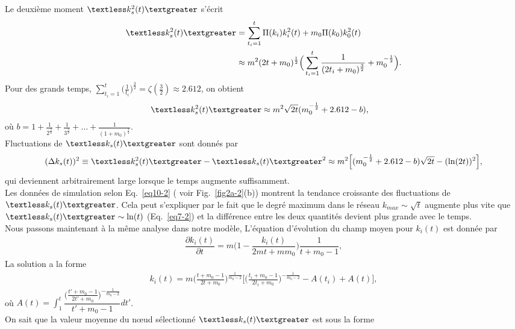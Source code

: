 Le deuxième moment $\kmss$ s'écrit
 \begin{align}
 \kmss&=\sum_{t_i=1}^t\Pi(k_i)k^2_i(t)+m_0\Pi(k_0)k_0^2(t)\label{eq8-2} \\
 &\approx m^2(2t+m_0)^{\frac{1}{2}} \Big(\sum_{t_i=1}^t \frac{1}{(2t_i+m_0)^{\frac{3}{2}}}+m_0^{-\frac{1}{2}}\Big).
 \end{align}
 Pour des grands temps, $\sum_{t_i=1}^t\Big(\frac{1}{t_i}\Big)^{\frac{3}{2}}=\zeta(\frac{3}{2}) \approx 2.612$, on obtient 
 \begin{eqnarray}
 \begin{split}
 \kmss&\approx m^2\sqrt{2t}(m_0^{-\frac{1}{2}}+2.612-b),
 \label{eq9-2}
 \end{split}
 \end{eqnarray}
où $b=1+\frac{1}{2^\frac{3}{2}}+\frac{1}{3^\frac{3}{2}}+\ldots+\frac{1}{(1+m_0)^\frac{3}{2}}$.\\
Fluctuations de $\kms$ sont donnés par
\begin{align}
(\Delta k_s(t))^2 \equiv \kmss-\kms^2\approx m^2 \Big[(m_0^{-\frac{1}{2}}+2.612-b)\sqrt{2t}-(\ln(2t))^2\Big],
\label{eq10-2}
\end{align}
qui deviennent arbitrairement large lorsque le temps augmente suffisamment. \\
Les données de simulation selon Eq.~\eqref{eq10-2} ( voir Fig.~\ref{fig2a-2}(b)) montrent la tendance croissante des fluctuations de $\kms$.
Cela peut s'expliquer par le fait que le degré maximum dans le réseau $k_{max}\sim \sqrt{t}$ \cite{Cohen-Havlinl2010} augmente plus vite que $\kms\sim \ln(t)$ (Eq.~\eqref{eq7-2}) et la différence entre les deux quantités devient plus grande avec le temps. \\
Nous passons maintenant à la même analyse dans notre modèle,  L'équation d'évolution du champ moyen pour $k_i(t)$ est donnée par
\begin{eqnarray}
\dfrac{\partial k_i(t)}{\partial t}=m\Big(1-\dfrac{k_i(t)}{2mt+mm_0}\Big)\dfrac{1}{t+m_0-1},
\end{eqnarray}
La solution a la forme
\begin{eqnarray}
k_i(t)=m \Big(\frac{t+m_0-1}{2t+m_0}\Big)^{\frac{1}{m_0-2}}\Bigg[\Big(\frac{t_i+m_0-1}{2t_i+m_0}\Big)^{-\frac{1}{m_0-2}}-A(t_i)
+A(t)\Bigg],
\label{kit}
\end{eqnarray}
où $A(t)=\displaystyle \int_1^{t}\dfrac{\Big(\frac{t'+m_0-1}{2t'+m_0}\Big)^{-\frac{1}{m_0-2}}}{t'+m_0-1}dt'$.\\
On sait que la valeur moyenne du nœud sélectionné $\kms$ est sous la forme 
